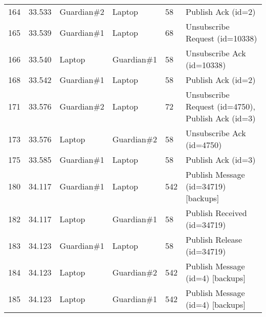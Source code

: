 \begin{table}[]
\begin{tabular}{llllll}
164 & 33.533 & Guardian\#2 & Laptop      & 58     & Publish Ack (id=2)                                                                                                                     \\
165 & 33.539 & Guardian\#1 & Laptop      & 68     & Unsubscribe Request (id=10338)                                                                                                         \\
166 & 33.540 & Laptop      & Guardian\#1 & 58     & Unsubscribe Ack (id=10338)                                                                                                             \\
168 & 33.542 & Guardian\#1 & Laptop      & 58     & Publish Ack (id=2)                                                                                                                     \\
171 & 33.576 & Guardian\#2 & Laptop      & 72     & Unsubscribe Request (id=4750), Publish Ack (id=3)                                                                                      \\
173 & 33.576 & Laptop      & Guardian\#2 & 58     & Unsubscribe Ack (id=4750)                                                                                                              \\
175 & 33.585 & Guardian\#1 & Laptop      & 58     & Publish Ack (id=3)                                                                                                                     \\
180 & 34.117 & Guardian\#1 & Laptop      & 542    & Publish Message (id=34719) {[}backups{]}                                                                                               \\
182 & 34.117 & Laptop      & Guardian\#1 & 58     & Publish Received (id=34719)                                                                                                            \\
183 & 34.123 & Guardian\#1 & Laptop      & 58     & Publish Release (id=34719)                                                                                                             \\
184 & 34.123 & Laptop      & Guardian\#2 & 542    & Publish Message (id=4) {[}backups{]}                                                                                                   \\
185 & 34.123 & Laptop      & Guardian\#1 & 542    & Publish Message (id=4) {[}backups{]}                                                                                                   \\

\end{tabular}
\end{table}
